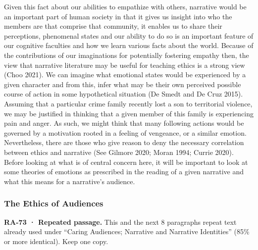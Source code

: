 \documentclass[
  letterpaper,
  DIV=11,
  numbers=noendperiod]{scrartcl}
\theoremstyle{remark}
\begin{document}
Given this fact about our abilities to empathize with others, narrative
would be an important part of human society in that it gives us insight
into who the members are that comprise that community, it enables us to
share their perceptions, phenomenal states and our ability to do so is
an important feature of our cognitive faculties and how we learn various
facts about the world. Because of the contributions of our imaginations
for potentially fostering empathy then, the view that narrative
literature may be useful for teaching ethics is a strong view (Choo
2021). We can imagine what emotional states would be experienced by a
given character and from this, infer what may be their own perceived
possible course of action in some hypothetical situation (De Smedt and
De Cruz 2015). Assuming that a particular crime family recently lost a
son to territorial violence, we may be justified in thinking that a
given member of this family is experiencing pain and anger. As such, we
might think that many following actions would be governed by a
motivation rooted in a feeling of vengeance, or a similar emotion.
Nevertheless, there are those who give reason to deny the necessary
correlation between ethics and narrative (See Gilmore 2020; Moran 1994;
Currie 2020). Before looking at what is of central concern here, it will
be important to look at some theories of emotions as prescribed in the
reading of a given narrative and what this means for a narrative's
audience.

\subsubsection{The Ethics of Audiences}\label{the-ethics-of-audiences}

\begin{tcolorbox}[enhanced jigsaw, arc=.35mm, bottomrule=.15mm, bottomtitle=1mm, breakable, colback=white, colbacktitle=quarto-callout-important-color!10!white, colframe=quarto-callout-important-color-frame, coltitle=black, left=2mm, leftrule=.75mm, opacityback=0, opacitybacktitle=0.6, rightrule=.15mm, title=\textcolor{quarto-callout-important-color}{\faExclamation}\hspace{0.5em}{Important}, titlerule=0mm, toprule=.15mm, toptitle=1mm]

\textbf{RA-73 · Repeated passage.} This and the next 8 paragraphs repeat
text already used under ``Caring Audiences; Narrative and Narrative
Identities'' (85\% or more identical). Keep one copy.

\end{tcolorbox}
\end{document}
